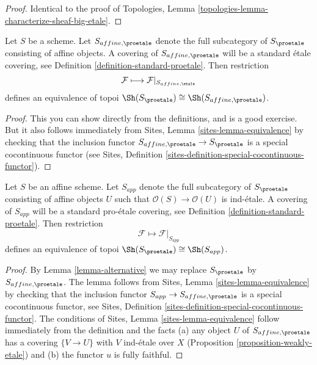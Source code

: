 \begin{proof}
Identical to the proof of
Topologies, Lemma \ref{topologies-lemma-characterize-sheaf-big-etale}.
\end{proof}

\begin{lemma}
\label{lemma-alternative}
Let $S$ be a scheme. Let $S_{affine, \proetale}$ denote the full subcategory
of $S_\proetale$ consisting of affine objects. A covering of
$S_{affine, \proetale}$ will be a standard \'etale covering, see
Definition \ref{definition-standard-proetale}.
Then restriction
$$
\mathcal{F} \longmapsto \mathcal{F}|_{S_{affine, \etale}}
$$
defines an equivalence of topoi
$\Sh(S_\proetale) \cong \Sh(S_{affine, \proetale})$.
\end{lemma}

\begin{proof}
This you can show directly from the definitions, and is a good exercise.
But it also follows immediately from
Sites, Lemma \ref{sites-lemma-equivalence}
by checking that the inclusion functor
$S_{affine, \proetale} \to S_\proetale$
is a special cocontinuous functor (see
Sites, Definition \ref{sites-definition-special-cocontinuous-functor}).
\end{proof}

\begin{lemma}
\label{lemma-affine-alternative}
Let $S$ be an affine scheme. Let $S_{app}$ denote the full subcategory
of $S_\proetale$ consisting of affine objects $U$ such that
$\mathcal{O}(S) \to \mathcal{O}(U)$ is ind-\'etale. A covering of
$S_{app}$ will be a standard pro-\'etale covering, see
Definition \ref{definition-standard-proetale}.
Then restriction
$$
\mathcal{F} \longmapsto \mathcal{F}|_{S_{app}}
$$
defines an equivalence of topoi $\Sh(S_\proetale) \cong \Sh(S_{app})$.
\end{lemma}

\begin{proof}
By Lemma \ref{lemma-alternative} we may replace $S_\proetale$ by
$S_{affine, \proetale}$.
The lemma follows from Sites, Lemma \ref{sites-lemma-equivalence}
by checking that the inclusion functor $S_{app} \to S_{affine, \proetale}$
is a special cocontinuous functor, see
Sites, Definition \ref{sites-definition-special-cocontinuous-functor}.
The conditions of Sites, Lemma \ref{sites-lemma-equivalence}
follow immediately from the definition and the facts
(a) any object $U$ of $S_{affine, \proetale}$ has a covering
$\{V \to U\}$ with $V$ ind-\'etale over $X$
(Proposition \ref{proposition-weakly-etale})
and (b) the functor $u$ is fully faithful.
\end{proof}

